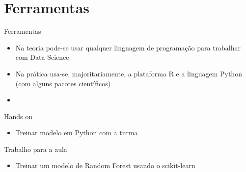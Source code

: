 \section{Ferramentas}

\begin{frame}	
	\begin{block}{Ferramentas}	
		\begin{itemize}
			\item Na teoria pode-se usar qualquer linguagem de programação para trabalhar com Data Science
			\item Na prática usa-se, majoritariamente, a plataforma R e a linguagem Python (com alguns pacotes científicos)
			\item \href{http://scikit-learn.org/stable/}{\color{blue}{scikit-learn}}
		\end{itemize}		
	\end{block}
\end{frame}

\begin{frame}	
	\begin{block}{Hands on}	
		\begin{itemize}
			\item Treinar modelo em Python com a turma
		\end{itemize}		
	\end{block}
\end{frame}

\begin{frame}	
	\begin{block}{Trabalho para a aula}	
		\begin{itemize}
			\item Treinar um modelo de Random Forest usando o scikit-learn
		\end{itemize}		
	\end{block}
\end{frame}
